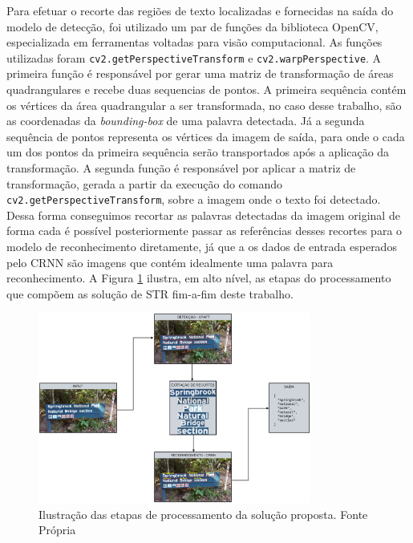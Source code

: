 


Para efetuar o recorte das regiões de texto localizadas e fornecidas na saída do modelo de detecção, foi utilizado um par de funções da biblioteca OpenCV, especializada em ferramentas voltadas para visão computacional. As funções utilizadas foram \texttt{cv2.getPerspectiveTransform} e \texttt{cv2.warpPerspective}.
A primeira função é responsável por gerar uma matriz de transformação de áreas quadrangulares e recebe duas sequencias de pontos. A primeira sequência contém os vértices da área quadrangular a ser transformada, no caso desse trabalho, são as coordenadas da \textit{bounding-box} de uma palavra detectada. Já a segunda sequência de pontos representa os vértices da imagem de saída, para onde o cada um dos pontos da primeira sequência serão transportados após a aplicação da transformação.
A segunda função é responsável por aplicar a matriz de transformação, gerada a partir da execução do comando \texttt{cv2.getPerspectiveTransform}, sobre a imagem onde o texto foi detectado. Dessa forma conseguimos recortar as palavras detectadas da imagem original de forma cada é possível posteriormente passar as referências desses recortes para o modelo de reconhecimento diretamente, já que a os dados de entrada esperados pelo CRNN são imagens que contém idealmente uma palavra para reconhecimento. A Figura \ref{fig:methodology_pipeline} ilustra, em alto nível, as etapas do processamento que compõem as solução de STR fim-a-fim deste trabalho.

\begin{figure}
    \centering
    \includegraphics[width=0.8\textwidth]{figs/metodologia-pipeline.png}
    \caption{Ilustração das etapas de processamento da solução proposta. Fonte Própria}
    \label{fig:methodology_pipeline}
\end{figure}

